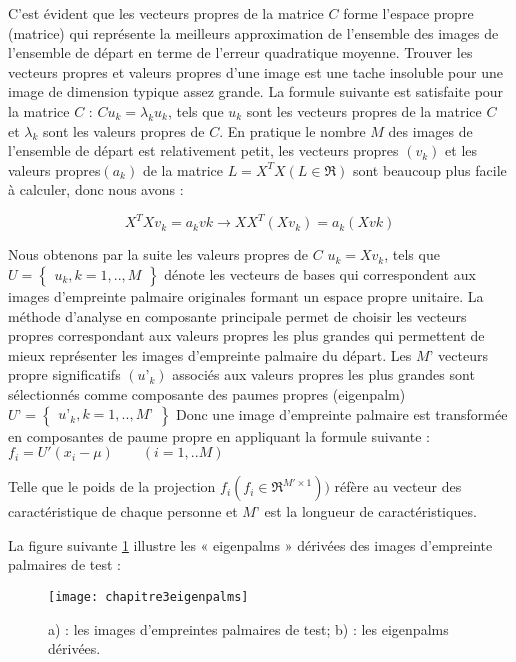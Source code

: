 C’est évident que les vecteurs propres de la matrice $C$ forme l’espace propre (matrice) qui représente la meilleurs approximation de l’ensemble des images de l’ensemble de départ en terme de l’erreur quadratique moyenne. Trouver les vecteurs propres et valeurs propres d’une image est une tache insoluble pour une image de dimension typique assez grande. La formule suivante est satisfaite pour la matrice $C$ : $Cu_{k}= \lambda_{k}u_{k}$, tels que $u_{k}$ sont les vecteurs propres de la matrice $C $ et $\lambda_{k}$ sont les valeurs propres de $C$.
En pratique le nombre $M$ des images de l’ensemble de départ est relativement petit, les vecteurs propres $(v_{k})$  et les valeurs propres$(a_{k})$ de la matrice $ L=X^{T}X(L \in\Re)$ sont beaucoup plus facile à calculer, donc nous avons : 
	\begin{center}
	\begin{equation}\label{eq:cn}
	X^{T}Xv_{k}=a_{k}v{k} \rightarrow XX^{T}(Xv_{k})=a_{k}(Xv{k})
	\end{equation}
\end{center}
Nous obtenons par la suite les valeurs propres de $C$ $u_{k}=Xv_{k}$, tels que $ U=\begin{Bmatrix}u_{k},k=1,..,M \end{Bmatrix} $ dénote les vecteurs de bases qui correspondent aux images d’empreinte palmaire originales formant un espace propre unitaire.
La méthode d’analyse en composante principale permet de choisir les vecteurs propres correspondant aux valeurs propres les plus grandes qui permettent de mieux représenter les images d’empreinte palmaire du départ. Les $ {M}’$ vecteurs propre significatifs $({u}’_{k})$ associés aux valeurs propres les plus grandes sont sélectionnés comme composante des paumes propres (eigenpalm) $ {U}’=\begin{Bmatrix} {u}’_{k},k=1,..,{M}’ \end{Bmatrix} $
Donc une image d’empreinte palmaire est transformée en composantes de paume propre en appliquant la formule suivante :  $f_{i}={U}'(x_{i}-\mu) \qquad (i=1,..M)$

Telle que le poids de la projection $f_{i}(f_{i} \in \Re ^{{M} '\times 1}))$ réfère au vecteur des caractéristique de chaque personne et $ {M}’ $ est la longueur de caractéristiques.

La figure suivante \ref{fig:chapitre3eigenpalms} illustre les « eigenpalms » dérivées des images d’empreinte palmaires de test :
\begin{center}
	\begin{figure}[H]
		\centering
		 \texttt{[image: chapitre3eigenpalms]}
		\caption{ a) : les images d’empreintes palmaires de test; b) : les eigenpalms dérivées.}
		\label{fig:chapitre3eigenpalms}
	\end{figure}
\end{center}
